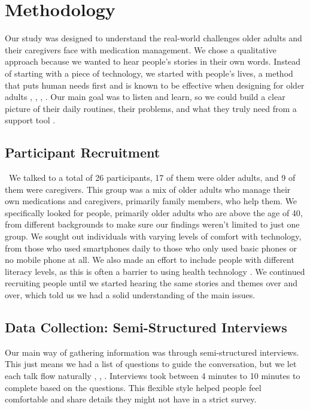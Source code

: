 \documentclass[acmlarge]{acmart}
\begin{document}
\section{Methodology~}
Our study was designed to understand the real-world challenges older
adults and their caregivers face with medication management. We chose a
qualitative approach because we wanted to hear people's stories in their
own words. Instead of starting with a piece of technology, we started
with people's lives, a method that puts human needs first and is known
to be effective when designing for older adults \cite{FERREIRA2014398}, \cite{10.1145/3357155.3358471}, \cite{10.1007/978-3-031-92707-2_9}, \cite{10.1145/3700794.3700803}.
Our main goal was to listen and learn, so we could build a clear picture
of their daily routines, their problems, and what they truly need from a
support tool \cite{10.1145/174800.174808}.

\subsection{Participant Recruitment}
~We talked to a total of 26 participants, 17 of them were older adults, and 9 of them were caregivers. This group was a mix of older adults who manage their own medications and caregivers, primarily family
members, who help them. We specifically looked for people, primarily older adults who are above the age of 40, from different backgrounds to make sure our findings weren't limited to just one group. We sought out individuals with varying levels of comfort with technology, from those who used smartphones daily to those who only used basic phones or no mobile phone at all. We also made an effort to include people with different literacy levels, as this is often a barrier to using health technology \cite{10.1145/3706598.3713617}. We continued recruiting people until we started hearing the same stories and themes over and over, which told us we had a solid understanding of the main issues.~

\subsection{Data Collection: Semi-Structured Interviews~}
Our main way of gathering information was through semi-structured
interviews. This just means we had a list of questions to guide the
conversation, but we let each talk flow naturally \cite{10.1145/3411764.3445702}, \cite{10.1145/3565698.3565774}, \cite{10.1145/3706598.3713839}.
Interviews took between 4 minutes to 10 minutes to complete based on the
questions. This flexible style helped people feel comfortable and share
details they might not have in a strict survey.
\end{document}
